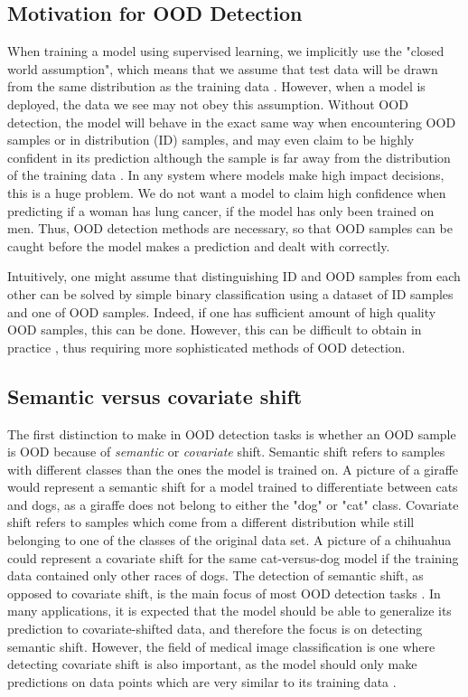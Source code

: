 \documentclass[conference,onecolumn]{IEEEtran}
\begin{document}
\subsection{Motivation for OOD Detection}

When training a model using supervised learning, we implicitly use the "closed world assumption", which means that we assume that test data will be drawn from the same distribution as the training data \cite{oodoverview}. However, when a model is deployed, the data we see may not obey this assumption. Without OOD detection, the model will behave in the exact same way when encountering OOD samples or in distribution (ID) samples, and may even claim to be highly confident in its prediction although the sample is far away from the distribution of the training data \cite[1]{energy}. In any system where models make high impact decisions, this is a huge problem. We do not want a model to claim high confidence when predicting if a woman has lung cancer, if the model has only been trained on men. Thus, OOD detection methods are necessary, so that OOD samples can be caught before the model makes a prediction and dealt with correctly.

Intuitively, one might assume that distinguishing ID and OOD samples from each other can be solved by simple binary classification using a dataset of ID samples and one of OOD samples. Indeed, if one has sufficient amount of high quality OOD samples, this can be done. However, this can be difficult to obtain in practice \cite[15]{oodoverview}, thus requiring more sophisticated methods of OOD detection.

\subsection{Semantic versus covariate shift}

The first distinction to make in OOD detection tasks is whether an OOD sample is OOD because of {\it semantic} or {\it covariate} shift. Semantic shift refers to samples with different classes than the ones the model is trained on. A picture of a giraffe would represent a semantic shift for a model trained to differentiate between cats and dogs, as a giraffe does not belong to either the "dog" or "cat" class. Covariate shift refers to samples which come from a different distribution while still belonging to one of the classes of the original data set. A picture of a chihuahua could represent a covariate shift for the same cat-versus-dog model if the training data contained only other races of dogs. The detection of semantic shift, as opposed to covariate shift, is the main focus of most OOD detection tasks \cite{oodoverview}. In many applications, it is expected that the model should be able to generalize its prediction to covariate-shifted data, and therefore the focus is on detecting semantic shift. However, the field of medical image classification is one where detecting covariate shift is also important, as the model should only make predictions on data points which are very similar to its training data \cite{oodoverview}.
\end{document}
